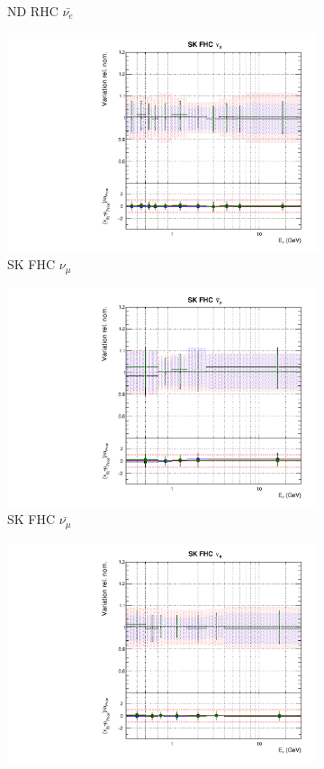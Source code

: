 \begin{figure}[t]
\begin{subfigure}{0.24\textwidth}
  \caption{ND RHC $\bar{\nu_e}$}
\end{subfigure}
\begin{subfigure}{0.24\textwidth}
  \centering
  \includegraphics[width=0.95\linewidth]{figs/hptpcfitsflux_8}
  \caption{SK FHC $\nu_{\mu}$}
\end{subfigure}
\begin{subfigure}{0.24\textwidth}
  \centering
  \includegraphics[width=0.95\linewidth]{figs/hptpcfitsflux_9}
  \caption{SK FHC $\bar{\nu_{\mu}}$}
\end{subfigure}
\begin{subfigure}{0.24\textwidth}
  \centering
  \includegraphics[width=0.95\linewidth]{figs/hptpcfitsflux_10}

\end{subfigure}
\end{figure}
